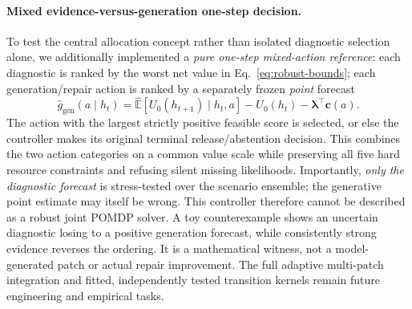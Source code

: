 \documentclass[pdflatex,sn-basic]{sn-jnl}
\begin{document}
\paragraph{Mixed evidence-versus-generation one-step decision.}
To test the central allocation concept rather than
isolated diagnostic selection alone, we additionally
implemented a \emph{pure one-step mixed-action
reference}: each diagnostic is ranked by the
worst net value in Eq.~\eqref{eq:robust-bounds};
each generation/repair action is ranked by a
separately frozen \emph{point} forecast
\begin{equation}
 \widehat g_{\mathrm{gen}}(a\mid h_t)
 =\widehat{\mathbb E}[U_0(h_{t+1})\mid h_t,a]
 -U_0(h_t)-\boldsymbol\lambda^\top\mathbf c(a).
 \label{eq:robust-mixed}
\end{equation}
The action with the largest strictly positive
feasible score is selected, or else the controller
makes its original terminal release/abstention
decision. This combines the two action categories
on a common value scale while preserving all
five hard resource constraints and refusing
silent missing likelihoods. Importantly,
\emph{only the diagnostic forecast} is
stress-tested over the scenario ensemble;
the generative point estimate may itself be
wrong. This controller therefore cannot be
described as a robust joint POMDP solver.
A toy counterexample shows an uncertain
diagnostic losing to a positive generation
forecast, while consistently strong evidence
reverses the ordering. It is a mathematical
witness, not a model-generated patch or
actual repair improvement. The full adaptive
multi-patch integration and fitted, independently
tested transition kernels remain future
engineering and empirical tasks.
\end{document}

